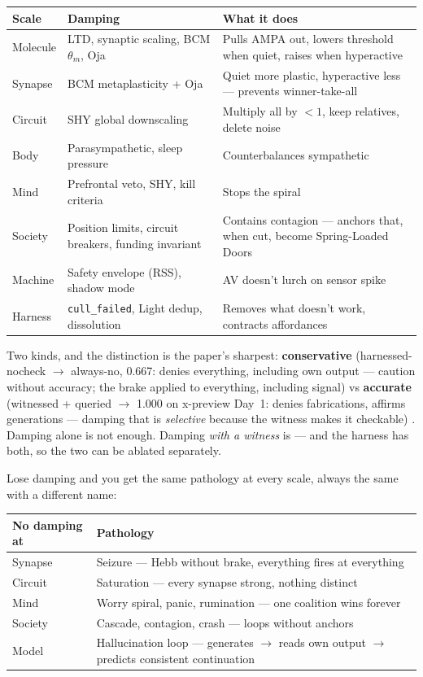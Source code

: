 \documentclass[11pt]{article}
\begin{document}
\begin{center}
\small
\begin{tabular}{p{2.4cm}p{4.2cm}p{5.2cm}}
\toprule
Scale & Damping & What it does \\
\midrule
Molecule & LTD, synaptic scaling, BCM $\theta_m$, Oja & Pulls AMPA out, lowers threshold when quiet, raises when hyperactive \\
Synapse & BCM metaplasticity + Oja & Quiet more plastic, hyperactive less --- prevents winner-take-all \\
Circuit & SHY global downscaling & Multiply all by $<1$, keep relatives, delete noise \\
Body & Parasympathetic, sleep pressure & Counterbalances sympathetic \\
Mind & Prefrontal veto, SHY, kill criteria & Stops the spiral \\
Society & Position limits, circuit breakers, funding invariant & Contains contagion --- anchors that, when cut, become Spring-Loaded Doors \\
Machine & Safety envelope (RSS), shadow mode & AV doesn't lurch on sensor spike \\
Harness & \texttt{cull\_failed}, Light dedup, dissolution & Removes what doesn't work, contracts affordances \\
\bottomrule
\end{tabular}
\end{center}

Two kinds, and the distinction is the paper's sharpest: \textbf{conservative} (harnessed-nocheck $\to$ always-no, 0.667: denies everything, including own output --- caution without accuracy; the brake applied to everything, including signal) vs \textbf{accurate} (witnessed + queried $\to$ 1.000 on x-preview Day~1: denies fabrications, affirms generations --- damping that is \emph{selective} because the witness makes it checkable) \citep{panickssery2024,macar2026}. Damping alone is not enough. Damping \emph{with a witness} is --- and the harness has both, so the two can be ablated separately.

Lose damping and you get the same pathology at every scale, always the same with a different name:

\begin{center}
\small
\begin{tabular}{p{2.6cm}p{6.5cm}}
\toprule
No damping at & Pathology \\
\midrule
Synapse & Seizure --- Hebb without brake, everything fires at everything \\
Circuit & Saturation --- every synapse strong, nothing distinct \\
Mind & Worry spiral, panic, rumination --- one coalition wins forever \\
Society & Cascade, contagion, crash --- loops without anchors \\
Model & Hallucination loop --- generates $\to$ reads own output $\to$ predicts consistent continuation \\
\bottomrule
\end{tabular}
\end{center}
\end{document}
